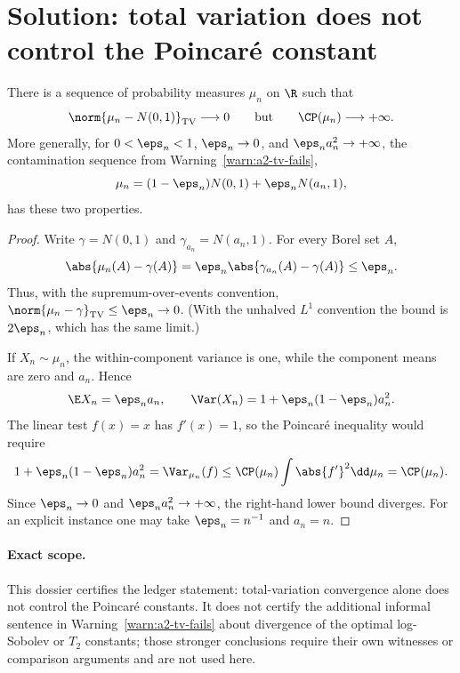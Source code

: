 \documentclass[../main.tex]{subfiles}
\begin{document}

\section*{Solution: total variation does not control the Poincar\'e constant}
\label{sec:sol-obs-tv-insufficient}

\begin{proposition}
\label{prop:sol-tv-insufficient}
There is a sequence of probability measures \(\mu_n\) on \(\R\) such that
\[
 \norm{\mu_n-N(0,1)}_{\mathrm{TV}}\longrightarrow0
 \qquad\text{but}\qquad
 \CP(\mu_n)\longrightarrow+\infty.
\]
More generally, for \(0<\eps_n<1\), \(\eps_n\to0\), and
\(\eps_na_n^2\to+\infty\), the contamination sequence from
Warning~\ref{warn:a2-tv-fails},
\[
 \mu_n=(1-\eps_n)N(0,1)+\eps_nN(a_n,1),
\]
has these two properties.
\end{proposition}

\begin{proof}
Write \(\gamma=N(0,1)\) and \(\gamma_{a_n}=N(a_n,1)\).  For every Borel set \(A\),
\[
 \abs{\mu_n(A)-\gamma(A)}
 =\eps_n\abs{\gamma_{a_n}(A)-\gamma(A)}\le\eps_n.
\]
Thus, with the supremum-over-events convention,
\(\norm{\mu_n-\gamma}_{\mathrm{TV}}\le\eps_n\to0\).  (With the unhalved
\(L^1\) convention the bound is \(2\eps_n\), which has the same limit.)

If \(X_n\sim\mu_n\), the within-component variance is one, while the component means are zero
and \(a_n\).  Hence
\[
 \E X_n=\eps_na_n,
 \qquad
 \Var(X_n)=1+\eps_n(1-\eps_n)a_n^2.
\]
The linear test \(f(x)=x\) has \(f'(x)=1\), so the Poincar\'e inequality would require
\[
 1+\eps_n(1-\eps_n)a_n^2=\Var_{\mu_n}(f)
 \le \CP(\mu_n)\int\abs{f'}^2\dd\mu_n=\CP(\mu_n).
\]
Since \(\eps_n\to0\) and \(\eps_na_n^2\to+\infty\), the right-hand lower bound diverges.
For an explicit instance one may take \(\eps_n=n^{-1}\) and \(a_n=n\).
\end{proof}

\paragraph{Exact scope.}
This dossier certifies the ledger statement: total-variation convergence alone does not control
the Poincar\'e constants.  It does not certify the additional informal sentence in
Warning~\ref{warn:a2-tv-fails} about divergence of the optimal log-Sobolev or \(T_2\) constants;
those stronger conclusions require their own witnesses or comparison arguments and are not used
here.
\end{document}
